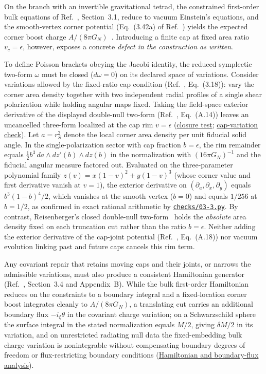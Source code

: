 \documentclass[10pt,a4paper]{article}
\numberwithin{equation}{section}
\newcommand{\repo}[2]{\href{https://github.com/sprajs/quantum-gravity/blob/main/#1}{#2}}
\begin{document}
On the branch with an invertible gravitational tetrad, the constrained first-order bulk equations of Ref.~\cite{Chandrasekaran2026}, Section~3.1, reduce to vacuum Einstein's equations, and the smooth-vertex corner potential (Eq.~(3.42a) of Ref.~\cite{Chandrasekaran2026}) yields the expected corner boost charge $A/(8\pi G_N)$~\cite{ChandrasekaranFlanagan2023}.
Introducing a finite cap at fixed area ratio $v_c=\epsilon$, however, exposes a concrete \emph{defect in the construction as written}.

To define Poisson brackets obeying the Jacobi identity, the reduced symplectic two-form $\omega$ must be closed ($d\omega=0$) on its declared space of variations.
Consider variations allowed by the fixed-ratio cap condition (Ref.~\cite{Chandrasekaran2026}, Eq.~(3.18)): vary the corner area density together with two independent radial profiles of a single shear polarization while holding angular maps fixed.
Taking the field-space exterior derivative of the displayed double-null two-form (Ref.~\cite{Chandrasekaran2026}, Eq.~(A.14)) leaves an uncancelled three-form localized at the cap rim $v=\epsilon$ (\repo{audit/03-3.md}{closure test}; \repo{audit/cap-crosscheck.md}{cap-variation check}).
Let $a=r_S^2$ denote the local corner area density per unit fiducial solid angle. In the single-polarization sector with cap fraction $b=\epsilon$, the rim remainder equals $\tfrac{1}{2}b^3\,da\wedge dz'(b)\wedge dz(b)$ in the normalization with $(16\pi G_N)^{-1}$ and the fiducial angular measure factored out.
Evaluated on the three-parameter polynomial family $z(v)=x(1-v)^2+y(1-v)^3$ (whose corner value and first derivative vanish at $v=1$), the exterior derivative on $(\partial_a,\partial_x,\partial_y)$ equals $b^3(1-b)^4/2$, which vanishes at the smooth vertex ($b=0$) and equals $1/256$ at $b=1/2$, as confirmed in exact rational arithmetic by \repo{checks/03-3.py}{\texttt{checks/03-3.py}}.
By contrast, Reisenberger's closed double-null two-form~\cite{Reisenberger2008,Reisenberger2013} holds the \emph{absolute} area density fixed on each truncation cut rather than the ratio $b=\epsilon$.
Neither adding the exterior derivative of the cap-joint potential (Ref.~\cite{Chandrasekaran2026}, Eq.~(A.18)) nor vacuum evolution linking past and future caps cancels this rim term.

Any covariant repair that retains moving caps and their joints, or narrows the admissible variations, must also produce a consistent Hamiltonian generator (Ref.~\cite{Chandrasekaran2026}, Section~3.4 and Appendix~B).
While the bulk first-order Hamiltonian reduces on the constraints to a boundary integral and a fixed-location corner boost integrates cleanly to $A/(8\pi G_N)$, a translating cut carries an additional boundary flux $-i_\xi\theta$ in the covariant charge variation; on a Schwarzschild sphere the surface integral in the stated normalization equals $M/2$, giving $\delta M/2$ in its variation, and on unrestricted radiating null data the fixed-embedding bulk charge variation is nonintegrable without compensating boundary degrees of freedom or flux-restricting boundary conditions (\repo{audit/03-4.md}{Hamiltonian and boundary-flux analysis}).
\end{document}
